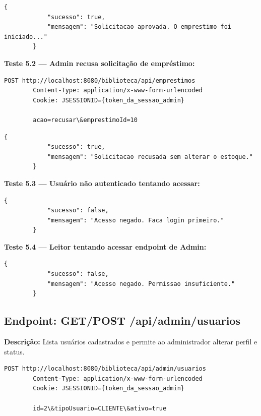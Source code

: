 	\begin{lstlisting}[style=sqlStyle, caption={Resposta esperada (HTTP 200 OK)}]
		{
			"sucesso": true,
			"mensagem": "Solicitacao aprovada. O emprestimo foi iniciado..."
		}
	\end{lstlisting}

	\textbf{Teste 5.2 --- Admin recusa solicitação de empréstimo:}

	\begin{lstlisting}[style=sqlStyle, caption={Requisição: POST /api/emprestimos acao=recusar}]
		POST http://localhost:8080/biblioteca/api/emprestimos
		Content-Type: application/x-www-form-urlencoded
		Cookie: JSESSIONID={token_da_sessao_admin}
		
		acao=recusar\&emprestimoId=10
	\end{lstlisting}

	\begin{lstlisting}[style=sqlStyle, caption={Resposta esperada (HTTP 200 OK)}]
		{
			"sucesso": true,
			"mensagem": "Solicitacao recusada sem alterar o estoque."
		}
	\end{lstlisting}
	
	\textbf{Teste 5.3 --- Usuário não autenticado tentando acessar:}
	
	\begin{lstlisting}[style=sqlStyle, caption={Resposta esperada (HTTP 401 Unauthorized)}]
		{
			"sucesso": false,
			"mensagem": "Acesso negado. Faca login primeiro."
		}
	\end{lstlisting}
	
	\textbf{Teste 5.4 --- Leitor tentando acessar endpoint de Admin:}
	
	\begin{lstlisting}[style=sqlStyle, caption={Resposta esperada (HTTP 403 Forbidden)}]
		{
			"sucesso": false,
			"mensagem": "Acesso negado. Permissao insuficiente."
		}
	\end{lstlisting}
	
	\subsection{Endpoint: GET/POST /api/admin/usuarios}
	
	\textbf{Descrição:} Lista usuários cadastrados e permite ao administrador alterar perfil e status.
	
	\begin{lstlisting}[style=sqlStyle, caption={Requisição: POST /api/admin/usuarios}]
		POST http://localhost:8080/biblioteca/api/admin/usuarios
		Content-Type: application/x-www-form-urlencoded
		Cookie: JSESSIONID={token_da_sessao_admin}
		
		id=2\&tipoUsuario=CLIENTE\&ativo=true
	\end{lstlisting}
	
